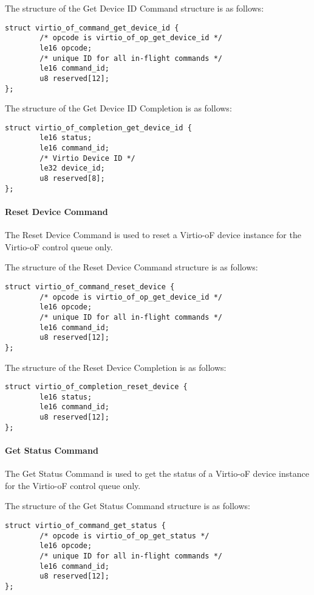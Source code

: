 The structure of the Get Device ID Command structure is as follows:
\begin{lstlisting}
struct virtio_of_command_get_device_id {
        /* opcode is virtio_of_op_get_device_id */
        le16 opcode;
        /* unique ID for all in-flight commands */
        le16 command_id;
        u8 reserved[12];
};
\end{lstlisting}

The structure of the Get Device ID Completion is as follows:
\begin{lstlisting}
struct virtio_of_completion_get_device_id {
        le16 status;
        le16 command_id;
        /* Virtio Device ID */
        le32 device_id;
        u8 reserved[8];
};
\end{lstlisting}

\paragraph{Reset Device Command}\label{sec:Virtio Transport Options / Virtio Over Fabrics / Commands Definition / Opcodes / Reset Device Command}
The Reset Device Command is used to reset a Virtio-oF device instance for the Virtio-oF control queue only.

The structure of the Reset Device Command structure is as follows:
\begin{lstlisting}
struct virtio_of_command_reset_device {
        /* opcode is virtio_of_op_get_device_id */
        le16 opcode;
        /* unique ID for all in-flight commands */
        le16 command_id;
        u8 reserved[12];
};
\end{lstlisting}

The structure of the Reset Device Completion is as follows:
\begin{lstlisting}
struct virtio_of_completion_reset_device {
        le16 status;
        le16 command_id;
        u8 reserved[12];
};
\end{lstlisting}

\paragraph{Get Status Command}\label{sec:Virtio Transport Options / Virtio Over Fabrics / Commands Definition / Opcodes / Get Status Command}
The Get Status Command is used to get the status of a Virtio-oF device instance for the Virtio-oF control queue only.

The structure of the Get Status Command structure is as follows:
\begin{lstlisting}
struct virtio_of_command_get_status {
        /* opcode is virtio_of_op_get_status */
        le16 opcode;
        /* unique ID for all in-flight commands */
        le16 command_id;
        u8 reserved[12];
};
\end{lstlisting}

